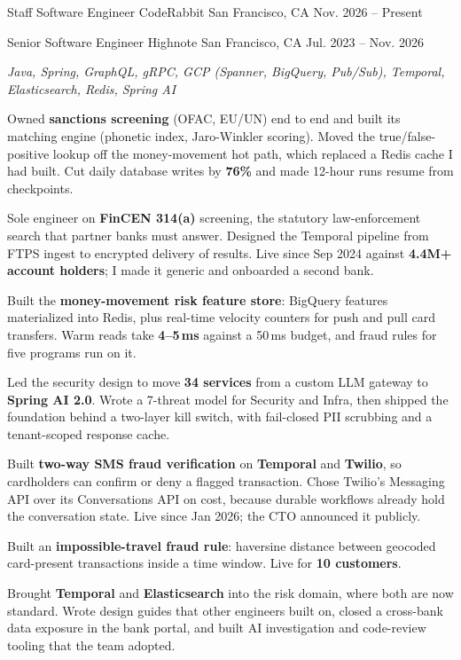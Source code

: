 \documentclass[11pt, letterpaper]{awesome-cv}
\begin{document}
\begin{cventries}

  \cventry
    {Staff Software Engineer}
    {CodeRabbit}
    {San Francisco, CA}
    {Nov. 2026 -- Present}
    {}

  \cventry
    {Senior Software Engineer}
    {Highnote}
    {San Francisco, CA}
    {Jul. 2023 -- Nov. 2026}
    {
      \begin{cvitems}
        \item {\textit{Java, Spring, GraphQL, gRPC, GCP (Spanner, BigQuery, Pub/Sub), Temporal, Elasticsearch, Redis, Spring AI}}
        \item {Owned \textbf{sanctions screening} (OFAC, EU/UN) end to end and built its matching engine (phonetic index, Jaro-Winkler scoring). Moved the true/false-positive lookup off the money-movement hot path, which replaced a Redis cache I had built. Cut daily database writes by \textbf{76\%} and made 12-hour runs resume from checkpoints.}
        \item {Sole engineer on \textbf{FinCEN 314(a)} screening, the statutory law-enforcement search that partner banks must answer. Designed the Temporal pipeline from FTPS ingest to encrypted delivery of results. Live since Sep 2024 against \textbf{4.4M+ account holders}; I made it generic and onboarded a second bank.}
        \item {Built the \textbf{money-movement risk feature store}: BigQuery features materialized into Redis, plus real-time velocity counters for push and pull card transfers. Warm reads take \textbf{4--5\,ms} against a 50\,ms budget, and fraud rules for five programs run on it.}
        \item {Led the security design to move \textbf{34 services} from a custom LLM gateway to \textbf{Spring AI 2.0}. Wrote a 7-threat model for Security and Infra, then shipped the foundation behind a two-layer kill switch, with fail-closed PII scrubbing and a tenant-scoped response cache.}
        \item {Built \textbf{two-way SMS fraud verification} on \textbf{Temporal} and \textbf{Twilio}, so cardholders can confirm or deny a flagged transaction. Chose Twilio's Messaging API over its Conversations API on cost, because durable workflows already hold the conversation state. Live since Jan 2026; the CTO announced it publicly.}
        \item {Built an \textbf{impossible-travel fraud rule}: haversine distance between geocoded card-present transactions inside a time window. Live for \textbf{10 customers}.}
        \item {Brought \textbf{Temporal} and \textbf{Elasticsearch} into the risk domain, where both are now standard. Wrote design guides that other engineers built on, closed a cross-bank data exposure in the bank portal, and built AI investigation and code-review tooling that the team adopted.}
      \end{cvitems}
    }


\end{cventries}
\end{document}
